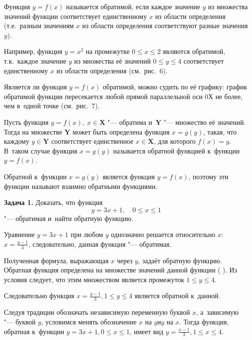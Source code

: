 \begin{Defi}
Функция $y = f(x)$ называется обратимой, если каждое значение $y$
из множества значений функции соответствует единственному $x$
из области определения (т.е.\ разным значениям $x$ из области определения
соответствуют разные значения $y$).
\end{Defi}

Например, функция $y = x^{2}$ на промежутке $0 \leqslant x \leqslant 2$
являются обратимой, т.к.\ каждое значение $y$ из множества её значений
$0 \leqslant y \leqslant 4$ соответствует единственному $x$ из области
определения (см.\ рис.\ 6).

Является ли функция $y = f(x)$ обратимой, можно судить по её графику:
график обратимой функции пересекается любой прямой параллельной оси 0Х
не более, чем в~одной точке (см.\ рис.\ 7).

\begin{Defi}
Пусть функция $y = f(x), \; x \in \mathbf{X}$ "--- обратима
и~$\mathbf{Y}$ "--- множество её значений.
Тогда на множестве $\mathbf{Y}$ может быть определена функция $x = g(y)$,
такая, что каждому $y \in \mathbf{Y}$ соответствует единственное $x \in \mathbf{X}$,
для которого $f(x) = y$.
В~таком случае функция $x = g(y)$ называется обратной функцией
к~функции $y = f(x)$.
\end{Defi}

Обратной к~функции $x = g(y)$ является функция $y = f(x)$, поэтому эти функции
называют взаимно обратными функциями.

\textbf{Задача 1.} Доказать, что функция
\begin{equation}
y = 3x + 1, \quad 0 \leqslant x \leqslant 1
\end{equation}
"--- обратимая и~найти обратную функцию.

Уравнение $y = 3x + 1$ при любом $y$ однозначно решается относительно $x$:
$\displaystyle x = \frac{y-1}{3}$, следовательно, данная функция "--- обратимая.

Полученная формула, выражающая $x$ через $y$, задаёт обратную функцию.
Обратная функция определена на множестве значений данной функции (
).
Из условия следует, что этим множеством является промежуток $1 \leqslant y \leqslant 4$.

Следовательно функция $\displaystyle x = \frac{y-1}{3}, 1 \leqslant y \leqslant 4$
является обратной к~данной.

Следуя традиции обозначать независимую переменную буквой $x$,
а~зависимую "--- буквой $y$, условимся менять обозначение $x$ на $y \text{и} y$ на $x$.
Тогда функция, обратная к~функции $y = 3x + 1, 0 \leqslant x \leqslant 1$,
имеет вид $\displaystyle y = \frac{x-1}{3}, 1 \leqslant x \leqslant 4$.

